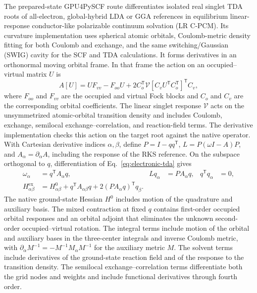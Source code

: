 The prepared-state GPU4PySCF route differentiates isolated real singlet
TDA roots of all-electron, global-hybrid LDA or GGA references in
equilibrium linear-response conductor-like polarizable continuum
solvation (LR C-PCM).\cite{gpu,cpcm,liangtda,liangpcm} Its curvature
implementation uses spherical atomic orbitals, Coulomb-metric density
fitting for both Coulomb and exchange, and the same switching/Gaussian
(SWIG) cavity for the SCF and TDA calculations. It forms derivatives
in an orthonormal moving orbital frame. In that frame the action on
an occupied--virtual matrix $U$ is
\begin{equation}
 A[U]=UF_{vv}-F_{oo}U
       +2C_o^{\mathsf T}\mathcal{V}[C_v U^{\mathsf T}C_o^{\mathsf T}]
                 ^{\mathsf T}C_v ,
\end{equation}
where $F_{oo}$ and $F_{vv}$ are the occupied and virtual Fock blocks
and $C_o$ and $C_v$ are the corresponding orbital coefficients.
The linear singlet response $\mathcal{V}$ acts on the unsymmetrized
atomic-orbital transition density and includes Coulomb, exchange,
semilocal exchange--correlation, and reaction-field terms.
The derivative implementation checks this action on the target root
against the native operator. With Cartesian derivative
indices $\alpha,\beta$, define
$P=I-qq^{\mathsf T}$, $L=P(\omega I-A)P$, and
$A_\alpha=\partial_\alpha A$, including the response of the RKS
reference. On the subspace orthogonal to $q$, differentiation of
Eq.~\eqref{eq:electronic-tda} gives
\begin{align}
 \omega_\alpha &= q^{\mathsf T} A_\alpha q, &
 L q_\alpha &= P A_\alpha q, &
 q^{\mathsf T} q_\alpha &=0, \\
 H^{\mathrm{ex}}_{\alpha\beta}
 &= H^{0}_{\alpha\beta}
 + q^{\mathsf T} A_{\alpha\beta}q
 + 2(PA_\alpha q)^{\mathsf T} q_\beta .
 \label{eq:electronic-hessian}
\end{align}
The native ground-state Hessian $H^0$ includes motion of the
quadrature and auxiliary basis. The mixed contraction at fixed $q$
contains first-order occupied orbital responses and an orbital
adjoint that eliminates the unknown second-order occupied--virtual
rotation. The integral terms include motion of the orbital and
auxiliary bases in the three-center integrals and inverse Coulomb
metric, with $\partial_\alpha M^{-1}=-M^{-1}M_\alpha M^{-1}$ for
the auxiliary metric $M$. The solvent terms include derivatives of
the ground-state reaction field and of the response to the
transition density. The semilocal exchange--correlation terms
differentiate both the grid nodes and weights and include functional
derivatives through fourth order.

